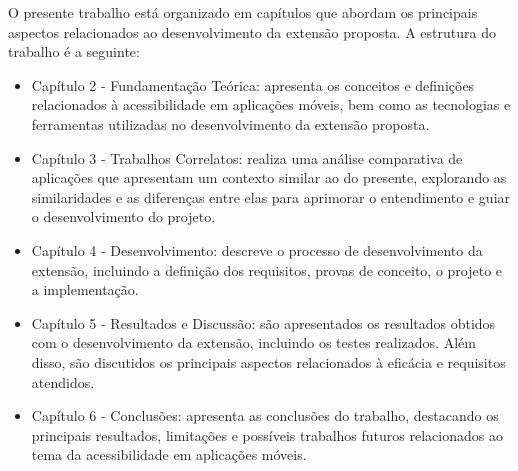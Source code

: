 O presente trabalho está organizado em capítulos que abordam os principais aspectos relacionados ao desenvolvimento da extensão proposta. A estrutura do trabalho é a seguinte:

\begin{itemize}
	\item Capítulo 2 - Fundamentação Teórica: apresenta os conceitos e definições relacionados à acessibilidade em aplicações móveis, bem como as tecnologias e ferramentas utilizadas no desenvolvimento da extensão proposta.
	\item Capítulo 3 - Trabalhos Correlatos: realiza uma análise comparativa de aplicações que apresentam um contexto similar ao do presente, explorando as similaridades e as diferenças entre elas para aprimorar o entendimento e guiar o desenvolvimento do projeto.
	\item Capítulo 4 - Desenvolvimento: descreve o processo de desenvolvimento da extensão, incluindo a definição dos requisitos, provas de conceito, o projeto e a implementação.
	\item Capítulo 5 - Resultados e Discussão: são apresentados os resultados obtidos com o desenvolvimento da extensão, incluindo os testes realizados. Além disso, são discutidos os principais aspectos relacionados à eficácia e requisitos atendidos.
	\item Capítulo 6 - Conclusões: apresenta as conclusões do trabalho, destacando os principais resultados, limitações e possíveis trabalhos futuros relacionados ao tema da acessibilidade em aplicações móveis.
\end{itemize}

